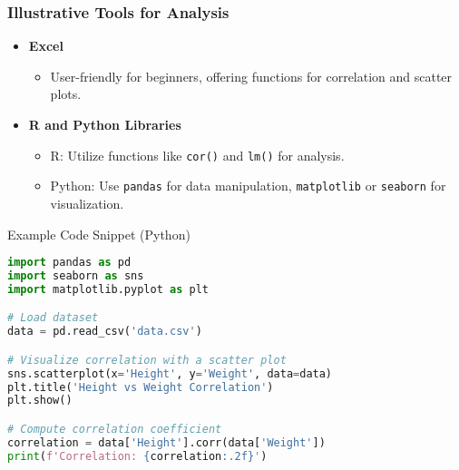 \documentclass[aspectratio=169]{beamer}
\begin{document}
\begin{frame}[fragile]
    \frametitle{Illustrative Tools for Analysis}
    \begin{itemize}
        \item \textbf{Excel}
            \begin{itemize}
                \item User-friendly for beginners, offering functions for correlation and scatter plots.
            \end{itemize}
        \item \textbf{R and Python Libraries}
            \begin{itemize}
                \item R: Utilize functions like \texttt{cor()} and \texttt{lm()} for analysis.
                \item Python: Use \texttt{pandas} for data manipulation, \texttt{matplotlib} or \texttt{seaborn} for visualization.
            \end{itemize}
    \end{itemize}
    
    \begin{block}{Example Code Snippet (Python)}
    \begin{lstlisting}[language=Python]
import pandas as pd
import seaborn as sns
import matplotlib.pyplot as plt

# Load dataset
data = pd.read_csv('data.csv')

# Visualize correlation with a scatter plot
sns.scatterplot(x='Height', y='Weight', data=data)
plt.title('Height vs Weight Correlation')
plt.show()

# Compute correlation coefficient
correlation = data['Height'].corr(data['Weight'])
print(f'Correlation: {correlation:.2f}')
    \end{lstlisting}
    \end{block}
\end{frame}
\end{document}
